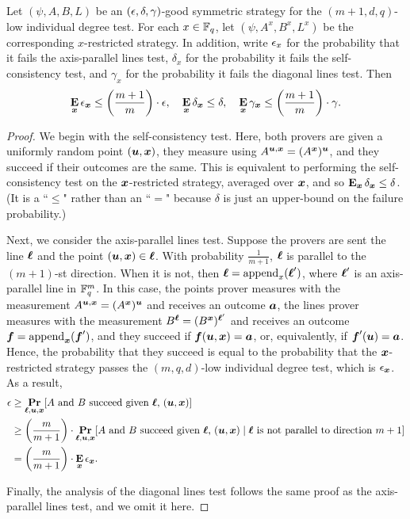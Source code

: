 \begin{lemma}\label{lem:restricted-probabilities}
Let $(\psi, A, B, L)$ be  an $(\epsilon, \delta, \gamma)$-good symmetric strategy
		for the $(m+1, d, q)$-low individual degree test.
For each $x \in \mathbb F_q$, let $(\psi, A^x, B^x, L^x)$ be the corresponding $x$-restricted strategy.
In addition, write $\epsilon_x$ for the probability that it fails the axis-parallel lines test,
$\delta_x$ for the probability it fails the self-consistency test,
and $\gamma_x$ for the probability it fails the diagonal lines test.
Then
\begin{equation*}
\mathop{\bf E\/}_{{\boldsymbol{x}}} \epsilon_{{\boldsymbol{x}}} \leq \left(\frac{m+1}{m}\right) \cdot\epsilon,
\quad
\mathop{\bf E\/}_{{\boldsymbol{x}}} \delta_{{\boldsymbol{x}}} \leq  \delta,
\quad
\mathop{\bf E\/}_{{\boldsymbol{x}}} \gamma_{{\boldsymbol{x}}} \leq \left(\frac{m+1}{m}\right) \cdot \gamma.
\end{equation*}
\end{lemma}
\begin{proof}
We begin with the self-consistency test.
Here, both provers are given a uniformly random point $(\boldsymbol{u}, {\boldsymbol{x}})$,
they measure using $A^{\boldsymbol{u}, {\boldsymbol{x}}} = (A^{{\boldsymbol{x}}})^{\boldsymbol{u}}$, and they succeed if their outcomes are the same.
This is equivalent to performing the self-consistency test on the ${\boldsymbol{x}}$-restricted strategy, averaged over ${\boldsymbol{x}}$,
and so $\mathop{\bf E\/}_{{\boldsymbol{x}}} \delta_{{\boldsymbol{x}}} \leq  \delta$. (It is a ``$\leq$" rather than an ``$=$" because $\delta$ is just an upper-bound on the failure probability.)

Next, we consider the axis-parallel lines test.
Suppose the provers are sent the line $\boldsymbol{\ell}$ and the point $(\boldsymbol{u}, {\boldsymbol{x}}) \in \boldsymbol{\ell}$.
With probability $\frac{1}{m+1}$, $\boldsymbol{\ell}$ is parallel to the $(m+1)$-st direction.
When it is not, then $\boldsymbol{\ell} = \mathrm{append}_x(\boldsymbol{\ell}')$, where $\boldsymbol{\ell}'$ is an axis-parallel line in $\mathbb F_q^m$.
In this case, the points prover measures with the measurement $A^{\boldsymbol{u}, {\boldsymbol{x}}} = (A^{\boldsymbol{x}})^{\boldsymbol{u}}$ and receives an outcome $\boldsymbol{a}$,
the lines prover measures with the measurement $B^{\boldsymbol{\ell}} = (B^{{\boldsymbol{x}}})^{\boldsymbol{\ell}'}$ and receives an outcome $\boldsymbol{f} = \mathrm{append}_{{\boldsymbol{x}}}(\boldsymbol{f}')$, and they succeed if $\boldsymbol{f}(\boldsymbol{u}, {\boldsymbol{x}}) = \boldsymbol{a}$, or, equivalently, if $\boldsymbol{f}'(\boldsymbol{u}) = \boldsymbol{a}$.
Hence, the probability that they succeed is equal to the probability that the ${\boldsymbol{x}}$-restricted strategy passes the $(m, q, d)$-low individual degree test, which is $\epsilon_{{\boldsymbol{x}}}$. As a result,
\begin{align*}
\epsilon
&\geq \mathop{\bf Pr\/}_{\boldsymbol{\ell}, \boldsymbol{u}, {\boldsymbol{x}}}[\text{$A$ and $B$ succeed given $\boldsymbol{\ell}$, $(\boldsymbol{u}, {\boldsymbol{x}})$}]\\
&\geq \left(\frac{m}{m+1}\right) \cdot \mathop{\bf Pr\/}_{\boldsymbol{\ell}, \boldsymbol{u}, {\boldsymbol{x}}}[\text{$A$ and $B$ succeed given $\boldsymbol{\ell}$, $(\boldsymbol{u}, {\boldsymbol{x}})$} \mid \text{$\boldsymbol{\ell}$ is not parallel to direction $m+1$}]\\
& =  \left(\frac{m}{m+1}\right) \cdot\mathop{\bf E\/}_{{\boldsymbol{x}}} \epsilon_{{\boldsymbol{x}}}.
\end{align*}

Finally, the analysis of the diagonal lines test follows the same proof as the axis-parallel lines test, and we omit it here.
\end{proof}

